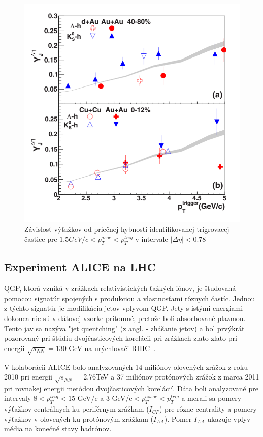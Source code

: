 \documentclass[thesismargins, thesislinespacing]{rnthesis}
\begin{document}
\begin{figure}[hbtp!]
	\centering
	\includegraphics[scale=0.5]{./Obrazky_praca/clanokstar.png}
	\caption{Závislosť výťažkov od priečnej hybnosti identifikovanej trigrovacej častice pre $1.5 GeV/c <p_T^{asoc}<p_T^{trig}$ v intervale $|\Delta\eta|<0.78$ ~\cite{clanokstar}}
	\label{clanokstar}
\end{figure}

\subsection{Experiment ALICE na LHC}
QGP, ktorá vzniká v zrážkach relativistických ťažkých iónov, je študovaná pomocou signatúr spojených s produkciou a vlastnosťami rôznych častíc. Jednou z týchto signatúr je modifikácia jetov vplyvom QGP. Jety s istými energiami dokonca nie sú v dátovej vzorke prítomné, pretože boli absorbované plazmou. Tento jav sa nazýva "jet quentching" (z angl. - zhášanie jetov) a bol prvýkrát pozorovaný pri štúdiu dvoj\-čas\-ti\-co\-vých korelácii pri zrážkach zlato-zlato pri energii $\sqrt{s_{NN}}=$130 GeV na urýchľovači RHIC~\cite{rhic}.

V kolaborácii ALICE bolo analyzovaných 14 miliónov olovených zrážok z roku 2010 pri energii $\sqrt{s_{NN}}=$2.76TeV a 37 miliónov protónových zrážok z marca 2011 pri rovnakej energii metódou dvojčasticových korelácií. Dáta boli analyzované pre intervaly $8<p^{trig}_{T}<15$ GeV/c a 3 GeV/c$<p^{assoc}_{T}<p_T^{trig}$ a merali sa pomery výťažkov centrálnych ku periférnym zrážkam ($I_{CP}$) pre rôzne centrality a pomery výťažkov v olovených ku protónovým zrážkam ($I_{AA}$). Pomer $I_{AA}$ ukazuje vplyv média na konečné stavy hadrónov. 
\end{document}
